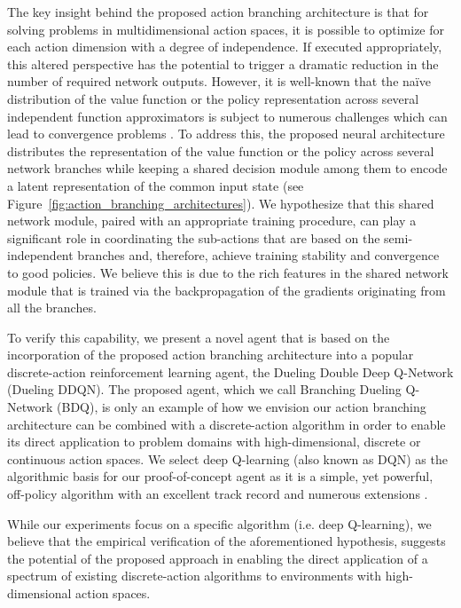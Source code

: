 \documentclass[letterpaper]{article} %
\newcommand{\citep}{\cite}
\begin{document}
The key insight behind the proposed action branching architecture is that for solving problems in multidimensional action spaces, it is possible to optimize for each action dimension with a degree of independence. If executed appropriately, this altered perspective has the potential to trigger a dramatic reduction in the number of required network outputs. However, it is well-known that the na{\"i}ve distribution of the value function or the policy representation across several independent function approximators is subject to numerous challenges which can lead to convergence problems \citep{Matignon:2012independent}.
To address this, the proposed neural architecture distributes the representation of the value function or the policy across several network branches while keeping a shared decision module among them to encode a latent representation of the common input state (see Figure~\ref{fig:action_branching_architectures}). We hypothesize that this shared network module, paired with an appropriate training procedure, can play a significant role in coordinating the sub-actions that are based on the semi-independent branches and, therefore, achieve training stability and convergence to good policies. We believe this is due to the rich features in the shared network module that is trained via the backpropagation of the gradients originating from all the branches.

To verify this capability, we present a novel agent that is based on the incorporation of the proposed action branching architecture into a popular discrete-action reinforcement learning agent, the Dueling Double Deep Q-Network (Dueling DDQN). The proposed agent, which we call Branching Dueling Q-Network (BDQ), is only an example of how we envision our action branching architecture can be combined with a discrete-action algorithm in order to enable its direct application to problem domains with high-dimensional, discrete or continuous action spaces. We select deep Q-learning (also known as DQN) as the algorithmic basis for our proof-of-concept agent as it is a simple, yet powerful, off-policy algorithm with an excellent track record and numerous extensions \citep{Hessel:2017Rainbow}.

While our experiments focus on a specific algorithm (i.e. deep Q-learning), we believe that the empirical verification of the aforementioned hypothesis, suggests the potential of the proposed approach in enabling the direct application of a spectrum of existing discrete-action algorithms to environments with high-dimensional action spaces.
\end{document}
